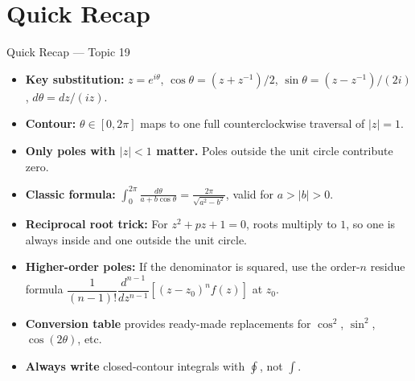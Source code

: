 \documentclass[12pt,a4paper]{article}
\begin{document}
\section{Quick Recap}

\begin{learnbox}{Quick Recap --- Topic 19}
\begin{itemize}
  \item \textbf{Key substitution:} $z = e^{i\theta}$, $\cos\theta = (z+z^{-1})/2$,
        $\sin\theta = (z-z^{-1})/(2i)$, $d\theta = dz/(iz)$.
  \item \textbf{Contour:} $\theta \in [0,2\pi]$ maps to one full counterclockwise
        traversal of $|z|=1$.
  \item \textbf{Only poles with $|z|<1$ matter.} Poles outside the unit circle
        contribute zero.
  \item \textbf{Classic formula:}
        $\displaystyle\int_0^{2\pi}\frac{d\theta}{a+b\cos\theta} = \frac{2\pi}{\sqrt{a^2-b^2}}$,
        valid for $a > |b| > 0$.
  \item \textbf{Reciprocal root trick:} For $z^2 + pz + 1 = 0$, roots multiply
        to $1$, so one is always inside and one outside the unit circle.
  \item \textbf{Higher-order poles:} If the denominator is squared, use the
        order-$n$ residue formula $\dfrac{1}{(n-1)!}\dfrac{d^{n-1}}{dz^{n-1}}[(z-z_0)^n f(z)]$ at $z_0$.
  \item \textbf{Conversion table} provides ready-made replacements for $\cos^2$,
        $\sin^2$, $\cos(2\theta)$, etc.
  \item \textbf{Always write} closed-contour integrals with $\oint$, not $\int$.
\end{itemize}
\end{learnbox}
\end{document}
